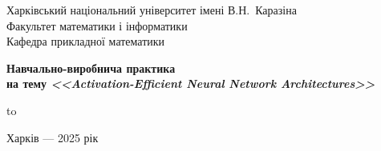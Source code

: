 \begin{titlepage}
	\begin{center}
		\Large Харківський національний університет імені В.Н.~Каразіна\\
		Факультет математики і інформатики\\
		Кафедра прикладної математики
	\end{center}

	\vfill
		
	\begin{center}	
		\LARGE \bfseries Навчально-виробнича практика
		\\[0.5\baselineskip]
		{\mdseries на тему} \bfseries\slshape <<Activation-Efficient Neural Network Architectures>> \\[0.5\baselineskip]
	\end{center}
	
	\vfill
	

	\setlength{\tabcolsep}{3pt}
	\hbox to 
	
\vspace{\baselineskip}
	
	\begin{center}
		Харків --- 2025 рік
	\end{center}
	
\end{titlepage}